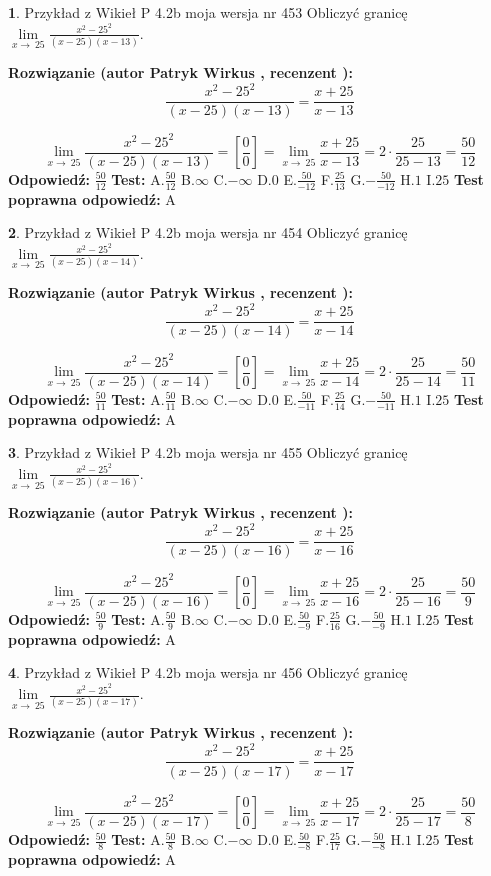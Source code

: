 \documentclass[12pt, a4paper]{article}
\theoremstyle{definition} %
\newtheorem{zad}{}
\newcommand{\zadStart}[1]{\begin{zad}#1\newline}
\newcommand{\zadStop}{\end{zad}}
\newcommand{\rozwStart}[2]{\noindent \textbf{Rozwiązanie (autor #1 , recenzent #2): }\newline}
\newcommand{\rozwStop}{\newline}
\newcommand{\odpStart}{\noindent \textbf{Odpowiedź:}\newline}
\newcommand{\odpStop}{\newline}
\newcommand{\testStart}{\noindent \textbf{Test:}\newline}
\newcommand{\testStop}{\newline}
\newcommand{\kluczStart}{\noindent \textbf{Test poprawna odpowiedź:}\newline}
\newcommand{\kluczStop}{\newline}
\begin{document}
\zadStart{Przykład z Wikieł P 4.2b moja wersja nr 453}
Obliczyć granicę $\lim\limits_{x\to\ 25}\frac{x^{2}-25^{2}}{(x-25)(x-13)}$.
\zadStop
\rozwStart{Patryk Wirkus}{}
$$\frac{x^{2}-25^{2}}{(x-25)(x-13)}=\frac{x+25}{x-13}$$

$$\lim\limits_{x\to\ 25}\frac{x^{2}-25^{2}}{(x-25)(x-13)}=[\frac{0}{0}]=\lim\limits_{x\to\ 25}\frac{x+25}{x-13}=2 \cdot \frac{25}{25-13} = \frac{50}{12}$$
\rozwStop
\odpStart
$\frac{50}{12}$
\odpStop
\testStart
A.$\frac{50}{12}$
B.$\infty$
C.$-\infty$
D.$0$
E.$\frac{50}{-12}$
F.$\frac{25}{13}$
G.$-\frac{50}{-12}$
H.$1$
I.$25$
\testStop
\kluczStart
A
\kluczStop



\zadStart{Przykład z Wikieł P 4.2b moja wersja nr 454}
Obliczyć granicę $\lim\limits_{x\to\ 25}\frac{x^{2}-25^{2}}{(x-25)(x-14)}$.
\zadStop
\rozwStart{Patryk Wirkus}{}
$$\frac{x^{2}-25^{2}}{(x-25)(x-14)}=\frac{x+25}{x-14}$$

$$\lim\limits_{x\to\ 25}\frac{x^{2}-25^{2}}{(x-25)(x-14)}=[\frac{0}{0}]=\lim\limits_{x\to\ 25}\frac{x+25}{x-14}=2 \cdot \frac{25}{25-14} = \frac{50}{11}$$
\rozwStop
\odpStart
$\frac{50}{11}$
\odpStop
\testStart
A.$\frac{50}{11}$
B.$\infty$
C.$-\infty$
D.$0$
E.$\frac{50}{-11}$
F.$\frac{25}{14}$
G.$-\frac{50}{-11}$
H.$1$
I.$25$
\testStop
\kluczStart
A
\kluczStop



\zadStart{Przykład z Wikieł P 4.2b moja wersja nr 455}
Obliczyć granicę $\lim\limits_{x\to\ 25}\frac{x^{2}-25^{2}}{(x-25)(x-16)}$.
\zadStop
\rozwStart{Patryk Wirkus}{}
$$\frac{x^{2}-25^{2}}{(x-25)(x-16)}=\frac{x+25}{x-16}$$

$$\lim\limits_{x\to\ 25}\frac{x^{2}-25^{2}}{(x-25)(x-16)}=[\frac{0}{0}]=\lim\limits_{x\to\ 25}\frac{x+25}{x-16}=2 \cdot \frac{25}{25-16} = \frac{50}{9}$$
\rozwStop
\odpStart
$\frac{50}{9}$
\odpStop
\testStart
A.$\frac{50}{9}$
B.$\infty$
C.$-\infty$
D.$0$
E.$\frac{50}{-9}$
F.$\frac{25}{16}$
G.$-\frac{50}{-9}$
H.$1$
I.$25$
\testStop
\kluczStart
A
\kluczStop



\zadStart{Przykład z Wikieł P 4.2b moja wersja nr 456}
Obliczyć granicę $\lim\limits_{x\to\ 25}\frac{x^{2}-25^{2}}{(x-25)(x-17)}$.
\zadStop
\rozwStart{Patryk Wirkus}{}
$$\frac{x^{2}-25^{2}}{(x-25)(x-17)}=\frac{x+25}{x-17}$$

$$\lim\limits_{x\to\ 25}\frac{x^{2}-25^{2}}{(x-25)(x-17)}=[\frac{0}{0}]=\lim\limits_{x\to\ 25}\frac{x+25}{x-17}=2 \cdot \frac{25}{25-17} = \frac{50}{8}$$
\rozwStop
\odpStart
$\frac{50}{8}$
\odpStop
\testStart
A.$\frac{50}{8}$
B.$\infty$
C.$-\infty$
D.$0$
E.$\frac{50}{-8}$
F.$\frac{25}{17}$
G.$-\frac{50}{-8}$
H.$1$
I.$25$
\testStop
\kluczStart
A
\kluczStop
\end{document}
